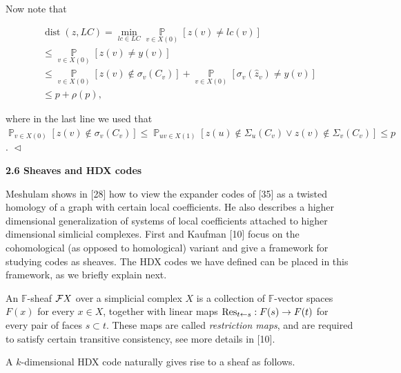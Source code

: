 Now note that\par


\[\begin{gathered}
\displaystyle\operatorname{dist}(z,LC) \displaystyle=\min_{lc\in LC}\operatorname*{\mathbb{P}}_{v\in X(0)}\left[z(v)\not=lc(v)\right] \\
\displaystyle\leq\operatorname*{\mathbb{P}}_{v\in X(0)}\left[z(v)\not=y(v)\right] \\
\displaystyle\leq\operatorname*{\mathbb{P}}_{v\in X(0)}\left[z(v)\not\in\sigma_{v}(C_{v})\right]+\operatorname*{\mathbb{P}}_{v\in X(0)}\left[\sigma_{v}(\hat{z}_{v})\not=y(v)\right] \\
\displaystyle\leq p+\rho(p),
\end{gathered}\]


where in the last line we used that $\operatorname*{\mathbb{P}}_{v\in X(0)}\left[z(v)\not\in\sigma_{v}(C_{v})\right]\leq\operatorname*{\mathbb{P}}_{uv\in X(1)}\left[z(u)\not\in\Sigma_{u}(C_{v})\vee z(v)\not\in\Sigma_{v}(C_{v})\right]\leq p$.
$\vartriangleleft$\par






\par\medskip\noindent\textbf{
2.6 Sheaves and HDX codes}\par




Meshulam shows in [28] how to view the expander codes of [35] as a twisted homology of a graph with certain local coefficients. He also describes a higher dimensional generalization of systems of local coefficients attached to higher dimensional simlicial complexes. First and Kaufman [10] focus on the cohomological (as opposed to homological) variant and give a framework for studying codes as sheaves. The HDX codes we have defined can be placed in this framework, as we briefly explain next.\par




An $\mathbb{F}$-sheaf ${\cal F}X$ over a simplicial complex $X$ is a collection of $\mathbb{F}$-vector spaces $F(x)$ for every $x\in X$, together with linear maps ${\rm Res}_{{t}\leftarrow{s}}:F(s)\to F(t)$ for every pair of faces $s\subset t$. These maps are called \emph{restriction maps}, and are required to satisfy certain transitive consistency, see more details in [10].\par




A $k$-dimensional HDX code naturally gives rise to a sheaf as follows.\par



